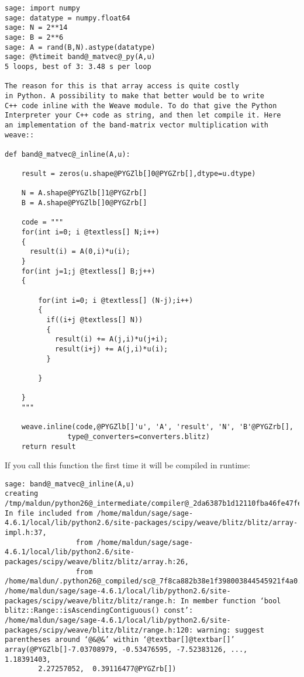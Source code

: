 \documentclass[letterpaper,10pt,english]{manual}
\begin{document}
\begin{Verbatim}[commandchars=@\[\]]
sage: import numpy
sage: datatype = numpy.float64
sage: N = 2**14
sage: B = 2**6
sage: A = rand(B,N).astype(datatype)
sage: @%timeit band@_matvec@_py(A,u)
5 loops, best of 3: 3.48 s per loop

The reason for this is that array access is quite costly
in Python. A possibility to make that better would be to write
C++ code inline with the Weave module. To do that give the Python
Interpreter your C++ code as string, and then let compile it. Here
an implementation of the band-matrix vector multiplication with weave::

def band@_matvec@_inline(A,u):

    result = zeros(u.shape@PYGZlb[]0@PYGZrb[],dtype=u.dtype)

    N = A.shape@PYGZlb[]1@PYGZrb[]
    B = A.shape@PYGZlb[]0@PYGZrb[]

    code = """
    for(int i=0; i @textless[] N;i++)
    {
      result(i) = A(0,i)*u(i);
    }
    for(int j=1;j @textless[] B;j++)
    {

        for(int i=0; i @textless[] (N-j);i++)
        {
          if((i+j @textless[] N))
          {
            result(i) += A(j,i)*u(j+i);
            result(i+j) += A(j,i)*u(i);
          }

        }

    }
    """

    weave.inline(code,@PYGZlb[]'u', 'A', 'result', 'N', 'B'@PYGZrb[],
               type@_converters=converters.blitz)
    return result
\end{Verbatim}

If you call this function the first time it will be compiled in
runtime:

\begin{Verbatim}[commandchars=@\[\]]
sage: band@_matvec@_inline(A,u)
creating /tmp/maldun/python26@_intermediate/compiler@_2da6387b1d12110fba46fe47fea9326a
In file included from /home/maldun/sage/sage-4.6.1/local/lib/python2.6/site-packages/scipy/weave/blitz/blitz/array-impl.h:37,
                 from /home/maldun/sage/sage-4.6.1/local/lib/python2.6/site-packages/scipy/weave/blitz/blitz/array.h:26,
                 from /home/maldun/.python26@_compiled/sc@_7f8ca882b38e1f398003844545921f4a0.cpp:11:
/home/maldun/sage/sage-4.6.1/local/lib/python2.6/site-packages/scipy/weave/blitz/blitz/range.h: In member function ‘bool blitz::Range::isAscendingContiguous() const’:
/home/maldun/sage/sage-4.6.1/local/lib/python2.6/site-packages/scipy/weave/blitz/blitz/range.h:120: warning: suggest parentheses around ‘@&@&’ within ‘@textbar[]@textbar[]’
array(@PYGZlb[]-7.03708979, -0.53476595, -7.52383126, ...,  1.18391403,
        2.27257052,  0.39116477@PYGZrb[])
\end{Verbatim}
\end{document}
